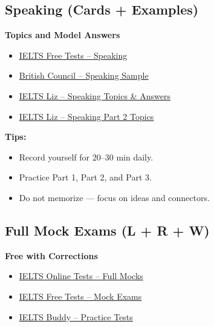 \subsection{Speaking  (Cards + Examples)}

\textbf{Topics and Model Answers}
\begin{itemize}
    \item \href{https://www.ieltsfreetests.com/speaking}{IELTS Free Tests – Speaking}
    \item \href{https://takeielts.britishcouncil.org/take-ielts/prepare/free-ielts-english-practice-tests/speaking}{British Council – Speaking Sample}
    \item \href{https://ieltsliz.com/ielts-speaking-topics-and-questions/}{IELTS Liz – Speaking Topics \& Answers}
    \item \href{https://ieltsliz.com/ielts-speaking-part-2-topics/}{IELTS Liz – Speaking Part 2 Topics}
\end{itemize}

\noindent\textbf{Tips:}
\begin{itemize}
    \item Record yourself for 20–30 min daily.
    \item Practice Part 1, Part 2, and Part 3.
    \item Do not memorize — focus on ideas and connectors.
\end{itemize}

\subsection{Full Mock Exams (L + R + W)}

\textbf{Free with Corrections}
\begin{itemize}
    \item \href{https://ieltsonlinetests.com/ielts-practice-tests}{IELTS Online Tests – Full Mocks}
    \item \href{https://www.ieltsfreetests.com/full-test}{IELTS Free Tests – Mock Exams}
    \item \href{https://www.ieltsbuddy.com/ielts-practice-tests.html}{IELTS Buddy – Practice Tests}
\end{itemize}

